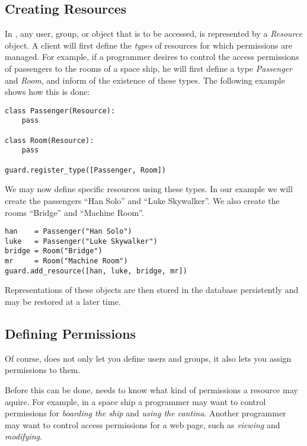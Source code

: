 \subsection{\label{intro:resources}Creating Resources}

In \product, any user, group, or object that is to be accessed, is 
represented by a {\it Resource} object. A client will first define 
the {\it types} of resources for which permissions are managed.
For example, if a programmer desires to control the access permissions 
of passengers to the rooms of a space ship, he will first define a type 
{\it Passenger} and {\it Room}, and inform \product of the 
existence of these types. The following example shows how this is done:

\begin{lstlisting}
class Passenger(Resource):
    pass

class Room(Resource):
    pass

guard.register_type([Passenger, Room])
\end{lstlisting}

We may now define specific resources using these types. In our example 
we will create the passengers ``Han Solo'' and ``Luke Skywalker''. We 
also create the rooms ``Bridge'' and ``Machine Room''.

\begin{lstlisting}
han    = Passenger("Han Solo")
luke   = Passenger("Luke Skywalker")
bridge = Room("Bridge")
mr     = Room("Machine Room")
guard.add_resource([han, luke, bridge, mr])
\end{lstlisting}

Representations of these objects are then stored in the database persistently 
and may be restored at a later time.


\subsection{\label{intro:permissions}Defining Permissions}

Of course, \product does not only let you define users and groups, it also 
lets you assign permissions to them.

Before this can be done, \product needs to know what kind of permissions 
a resource may aquire. For example, in a space ship a programmer may 
want to control permissions for {\it boarding the ship} and {\it using 
the cantina}. Another programmer may want to control access permissions 
for a web page, such as {\it viewing} and {\it modifying}.

